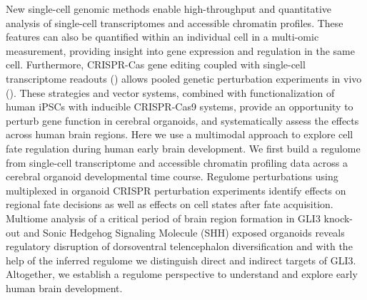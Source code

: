 New single-cell genomic methods enable high-throughput and quantitative analysis of single-cell transcriptomes and accessible chromatin profiles. These features can also be quantified within an individual cell in a multi-omic measurement, providing insight into gene expression and regulation in the same cell. Furthermore, CRISPR-Cas gene editing coupled with single-cell transcriptome readouts (\cite{dixit_perturb-seq_2016,jaitin_massively_2014,datlinger_pooled_2017}) allows pooled genetic perturbation experiments in vivo (\cite{jin_vivo_2020}). These strategies and vector systems, combined with functionalization of human iPSCs with inducible CRISPR-Cas9 systems, provide an opportunity to perturb gene function in cerebral organoids, and systematically assess the effects across human brain regions.
Here we use a multimodal approach to explore cell fate regulation during human early brain development. We first build a regulome from single-cell transcriptome and accessible chromatin profiling data across a cerebral organoid developmental time course. Regulome perturbations using multiplexed in organoid CRISPR perturbation experiments identify effects on regional fate decisions as well as effects on cell states after fate acquisition. Multiome analysis of a critical period of brain region formation in GLI3 knock-out and Sonic Hedgehog Signaling Molecule (SHH) exposed organoids reveals regulatory disruption of dorsoventral telencephalon diversification and with the help of the inferred regulome we distinguish direct and indirect targets of GLI3. Altogether, we establish a regulome perspective to understand and explore early human brain development.


